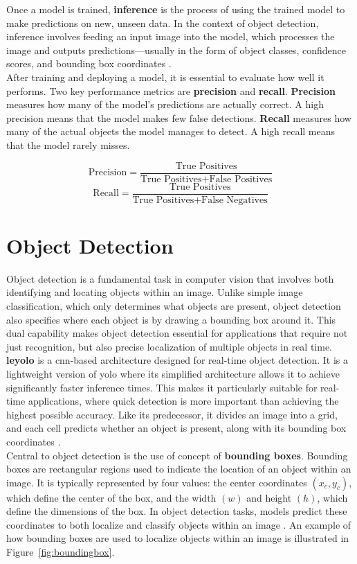 Once a model is trained, \textbf{inference} is the process of using the trained model to make predictions on new, unseen data. In the context of object detection, inference involves feeding an input image into the model, which processes the image and outputs predictions—usually in the form of object classes, confidence scores, and bounding box coordinates \cite{nvidia:inference}. \\

After training and deploying a model, it is essential to evaluate how well it performs. Two key performance metrics are \textbf{precision} and \textbf{recall}. \textbf{Precision} measures how many of the model’s predictions are actually correct. A high precision means that the model makes few false detections. \textbf{Recall} measures how many of the actual objects the model manages to detect. A high recall means that the model rarely misses.

\[
\text{Precision} = \frac{\text{True Positives}}{\text{True Positives} + \text{False Positives}}
\]
\[
\text{Recall} = \frac{\text{True Positives}}{\text{True Positives} + \text{False Negatives}}
\]

\section{Object Detection}
Object detection is a fundamental task in computer vision that involves both identifying and locating objects within an image. Unlike simple image classification, which only determines what objects are present, object detection also specifies where each object is by drawing a bounding box around it. This dual capability makes object detection essential for applications that require not just recognition, but also precise localization of multiple objects in real time. \\

\textbf{\gls{leyolo}} is a \gls{cnn}-based architecture designed for real-time object detection. It is a lightweight version of \gls{yolo} where its simplified architecture allows it to achieve significantly faster inference times. This makes it particularly suitable for real-time applications, where quick detection is more important than achieving the highest possible accuracy. Like its predecessor, it divides an image into a grid, and each cell predicts whether an object is present, along with its bounding box coordinates \cite{openreview:leyolo}.\\

Central to object detection is the use of concept of \textbf{bounding boxes}. Bounding boxes are rectangular regions used to indicate the location of an object within an image. It is typically represented by four values: the center coordinates \((x_c, y_c)\), which define the center of the box, and the width \((w)\) and height \((h)\), which define the dimensions of the box. In object detection tasks, models predict these coordinates to both localize and classify objects within an image \cite{peopleforai:boundingbox}. An example of how bounding boxes are used to localize objects within an image is illustrated in Figure~\ref{fig:boundingbox}.

